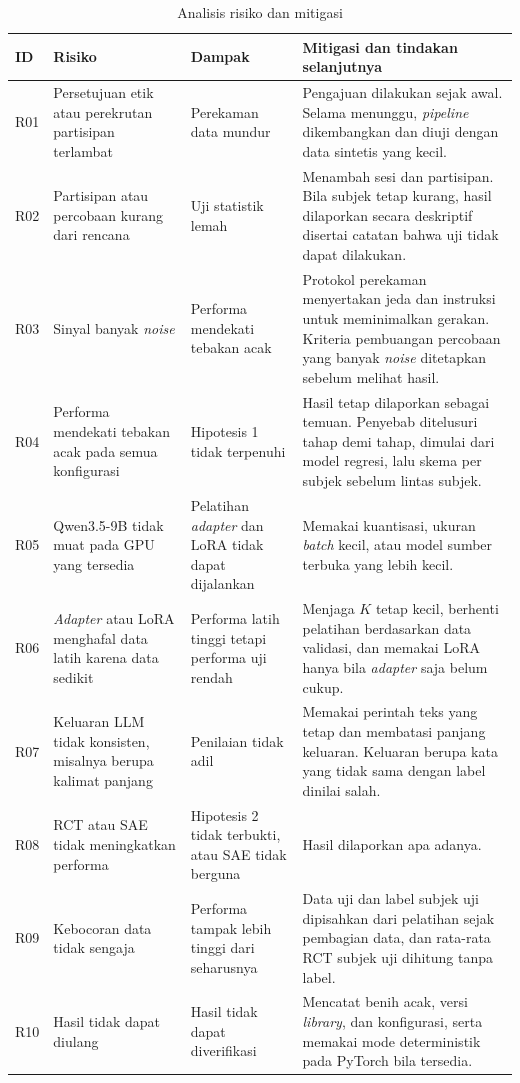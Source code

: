 \begin{table}[H]
  \centering
  \caption{Analisis risiko dan mitigasi}
  \label{tab:risiko}
  \footnotesize
  \begin{tabularx}{\textwidth}{| l | Z{0.2\textwidth} | Z{0.2\textwidth} | Y |}
    \hline
    ID & Risiko & Dampak & Mitigasi dan tindakan selanjutnya \\
    \hline
    R01 & Persetujuan etik atau perekrutan partisipan terlambat & Perekaman data mundur & Pengajuan dilakukan sejak awal. Selama menunggu, \textit{pipeline} dikembangkan dan diuji dengan data sintetis yang kecil. \\
    \hline
    R02 & Partisipan atau percobaan kurang dari rencana & Uji statistik lemah & Menambah sesi dan partisipan. Bila subjek tetap kurang, hasil dilaporkan secara deskriptif disertai catatan bahwa uji tidak dapat dilakukan. \\
    \hline
    R03 & Sinyal banyak \textit{noise} & Performa mendekati tebakan acak & Protokol perekaman menyertakan jeda dan instruksi untuk meminimalkan gerakan. Kriteria pembuangan percobaan yang banyak \textit{noise} ditetapkan sebelum melihat hasil. \\
    \hline
    R04 & Performa mendekati tebakan acak pada semua konfigurasi & Hipotesis 1 tidak terpenuhi & Hasil tetap dilaporkan sebagai temuan. Penyebab ditelusuri tahap demi tahap, dimulai dari model regresi, lalu skema per subjek sebelum lintas subjek. \\
    \hline
    R05 & Qwen3.5-9B tidak muat pada GPU yang tersedia & Pelatihan \textit{adapter} dan LoRA tidak dapat dijalankan & Memakai kuantisasi, ukuran \textit{batch} kecil, atau model sumber terbuka yang lebih kecil. \\
    \hline
    R06 & \textit{Adapter} atau LoRA menghafal data latih karena data sedikit & Performa latih tinggi tetapi performa uji rendah & Menjaga $K$ tetap kecil, berhenti pelatihan berdasarkan data validasi, dan memakai LoRA hanya bila \textit{adapter} saja belum cukup. \\
    \hline
    R07 & Keluaran LLM tidak konsisten, misalnya berupa kalimat panjang & Penilaian tidak adil & Memakai perintah teks yang tetap dan membatasi panjang keluaran. Keluaran berupa kata yang tidak sama dengan label dinilai salah. \\
    \hline
    R08 & RCT atau SAE tidak meningkatkan performa & Hipotesis 2 tidak terbukti, atau SAE tidak berguna & Hasil dilaporkan apa adanya. \\
    \hline
    R09 & Kebocoran data tidak sengaja & Performa tampak lebih tinggi dari seharusnya & Data uji dan label subjek uji dipisahkan dari pelatihan sejak pembagian data, dan rata-rata RCT subjek uji dihitung tanpa label. \\
    \hline
    R10 & Hasil tidak dapat diulang & Hasil tidak dapat diverifikasi & Mencatat benih acak, versi \textit{library}, dan konfigurasi, serta memakai mode deterministik pada PyTorch bila tersedia. \\
    \hline
  \end{tabularx}
\end{table}

